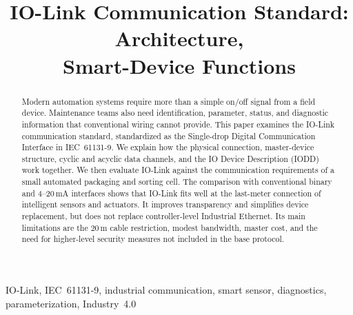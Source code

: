 \documentclass[conference]{IEEEtran}
\begin{document}
\title{IO-Link Communication Standard: Architecture,\\
Smart-Device Functions}

\author{
  \and
}

\maketitle

\begin{abstract}
Modern automation systems require more than a simple on/off signal from
a field device. Maintenance teams also need identification, parameter,
status, and diagnostic information that conventional wiring cannot
provide. This paper examines the IO-Link communication standard,
standardized as the Single-drop Digital Communication Interface in
IEC~61131-9. We explain how the physical connection, master-device
structure, cyclic and acyclic data channels, and the IO Device
Description (IODD) work together. We then evaluate IO-Link against the
communication requirements of a small automated packaging and sorting
cell. The comparison with conventional binary and 4--20\,mA interfaces
shows that IO-Link fits well at the last-meter connection of intelligent
sensors and actuators. It improves transparency and simplifies device
replacement, but does not replace controller-level Industrial Ethernet.
Its main limitations are the 20\,m cable restriction, modest bandwidth,
master cost, and the need for higher-level security measures not
included in the base protocol.
\end{abstract}

\begin{IEEEkeywords}
IO-Link, IEC~61131-9, industrial communication, smart sensor,
diagnostics, parameterization, Industry~4.0
\end{IEEEkeywords}
\end{document}

